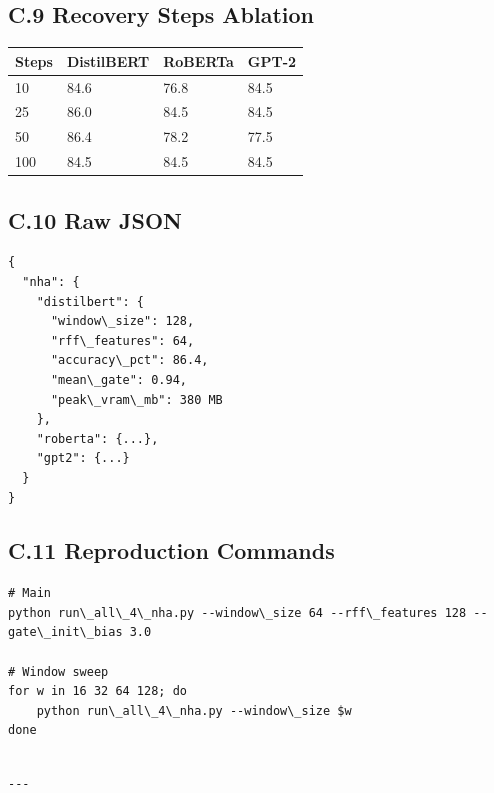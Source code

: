 \subsection{C.9 Recovery Steps Ablation}

\begin{table}[H]
\centering
\small
\begin{tabular}{llll}
\toprule
\textbf{Steps} & \textbf{DistilBERT} & \textbf{RoBERTa} & \textbf{GPT-2} \\
\midrule
10 & 84.6 & 76.8 & 84.5 \\
25 & 86.0 & 84.5 & 84.5 \\
50 & 86.4 & 78.2 & 77.5 \\
100 & 84.5 & 84.5 & 84.5 \\
\bottomrule
\end{tabular}
\end{table}

\subsection{C.10 Raw JSON}

\begin{lstlisting}
{
  "nha": {
    "distilbert": {
      "window\_size": 128,
      "rff\_features": 64,
      "accuracy\_pct": 86.4,
      "mean\_gate": 0.94,
      "peak\_vram\_mb": 380 MB
    },
    "roberta": {...},
    "gpt2": {...}
  }
}
\end{lstlisting}

\subsection{C.11 Reproduction Commands}

\begin{lstlisting}
# Main
python run\_all\_4\_nha.py --window\_size 64 --rff\_features 128 --gate\_init\_bias 3.0

# Window sweep
for w in 16 32 64 128; do
    python run\_all\_4\_nha.py --window\_size $w
done
\end{lstlisting}
\begin{lstlisting}

---
\end{lstlisting}
